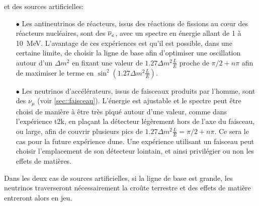       et des sources artificielles:
      \begin{itemize}
        \item[$\bullet$] Les antineutrinos de réacteurs, issus des réactions de fissions au cœur des réacteurs nucléaires, sont des $\overline{\nu}_e$, avec un spectre en énergie allant de 1 à \SI{10}{\mega\electronvolt}.
        L'avantage de ces expériences est qu'il est possible, dans une certaine limite, de choisir la ligne de base afin d'optimiser une oscillation autour d'un $\Delta m^2$ en fixant une valeur de $1.27\Delta m^2\frac{L}{E}$ proche de $\pi/2+n\pi$ afin de maximiser le terme en $\sin^2(1.27\Delta m^2\frac{L}{E})$.
        \item[$\bullet$] Les neutrinos d'accélérateurs, issus de faisceaux produits par l'homme, sont des $\nu_{\mu}$ (voir \autoref{sec::faisceau}). L'énergie est ajustable et le spectre peut être choisi de manière à être très piqué autour d'une valeur, comme dans l'expérience \gls{t2k}, en plaçant la détecteur légèrement hors de l'axe du faisceau\cite{McDonald2001}, ou large, afin de couvrir plusieurs pics de $1.27\Delta m^2\frac{L}{E}=\pi/2+n\pi$. Ce sera le cas pour la future expérience \gls{dune}. Une expérience utilisant un faisceau peut choisir l'emplacement de son détecteur lointain, et ainsi privilégier ou non les effets de matières.
      \end{itemize}
      Dans les deux cas de sources artificielles, si la ligne de base est grande, les neutrinos traverseront nécessairement la croûte terrestre et des effets de matière entreront alors en jeu.

